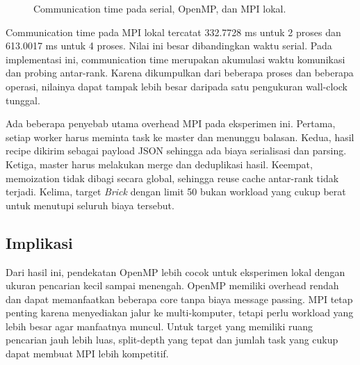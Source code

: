 \documentclass[conference]{IEEEtran}
\begin{document}
\begin{figure}[!t]
\centering
{}
\caption{Communication time pada serial, OpenMP, dan MPI lokal.}
\label{fig:commplot}
\end{figure}

Communication time pada MPI lokal tercatat 332.7728 ms untuk 2 proses dan 613.0017 ms untuk 4 proses. Nilai ini besar dibandingkan waktu serial. Pada implementasi ini, communication time merupakan akumulasi waktu komunikasi dan probing antar-rank. Karena dikumpulkan dari beberapa proses dan beberapa operasi, nilainya dapat tampak lebih besar daripada satu pengukuran wall-clock tunggal.

Ada beberapa penyebab utama overhead MPI pada eksperimen ini. Pertama, setiap worker harus meminta task ke master dan menunggu balasan. Kedua, hasil recipe dikirim sebagai payload JSON sehingga ada biaya serialisasi dan parsing. Ketiga, master harus melakukan merge dan deduplikasi hasil. Keempat, memoization tidak dibagi secara global, sehingga reuse cache antar-rank tidak terjadi. Kelima, target \textit{Brick} dengan limit 50 bukan workload yang cukup berat untuk menutupi seluruh biaya tersebut.

\subsection{Implikasi}

Dari hasil ini, pendekatan OpenMP lebih cocok untuk eksperimen lokal dengan ukuran pencarian kecil sampai menengah. OpenMP memiliki overhead rendah dan dapat memanfaatkan beberapa core tanpa biaya message passing. MPI tetap penting karena menyediakan jalur ke multi-komputer, tetapi perlu workload yang lebih besar agar manfaatnya muncul. Untuk target yang memiliki ruang pencarian jauh lebih luas, split-depth yang tepat dan jumlah task yang cukup dapat membuat MPI lebih kompetitif.
\end{document}

